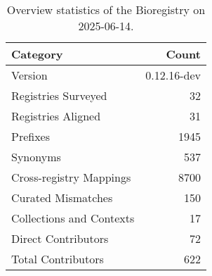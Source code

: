 \begin{table}
\caption{Overview statistics of the Bioregistry on 2025-06-14.}
\label{tab:bioregistry-summary}
\begin{tabular}{lr}
\toprule
Category & Count \\
\midrule
Version & 0.12.16-dev \\
Registries Surveyed & 32 \\
Registries Aligned & 31 \\
Prefixes & 1945 \\
Synonyms & 537 \\
Cross-registry Mappings & 8700 \\
Curated Mismatches & 150 \\
Collections and Contexts & 17 \\
Direct Contributors & 72 \\
Total Contributors & 622 \\
\bottomrule
\end{tabular}
\end{table}
